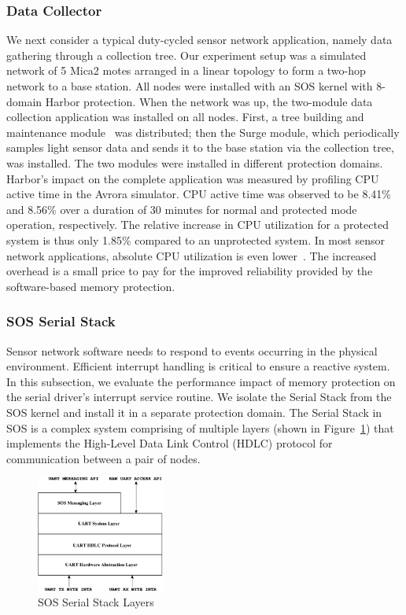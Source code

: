 \subsubsection{Data Collector}
%
We next consider a typical duty-cycled sensor network application,
namely data gathering through a collection tree.
%
Our experiment setup was a simulated network of 5 Mica2 motes arranged
in a linear topology to form a two-hop network to a base station.
%
All nodes were installed with an SOS kernel with 8-domain Harbor protection.
%
When the network was up, the two-module data collection application was
installed on all nodes.
%
First, a tree building and maintenance module~\cite{woo03surge} was
distributed; then
%
the Surge module, which periodically samples light sensor data and sends it
to the base station via the collection tree, was installed.
%
The two modules were installed in different protection domains.
%
Harbor's impact on the complete application was measured by profiling CPU
active time in the Avrora simulator.
%
CPU active time was observed to be 8.41\% and 8.56\% over a duration
of 30 minutes for normal and protected mode operation, respectively. 
%
The relative increase in CPU utilization for a protected system is
thus only 1.85\% compared to an unprotected system.
%
In most sensor network applications, absolute CPU utilization is even
lower~\cite{tkernel06sensys}.
%
The increased overhead is a small price to pay for the improved
reliability provided by the software-based memory protection.
\subsubsection{SOS Serial Stack}
%
Sensor network software needs to respond to events occurring in the
physical environment.
%
Efficient interrupt handling is critical to ensure a reactive system.
%
In this subsection, we evaluate the performance impact of memory
protection on the serial driver's interrupt service routine.
%
We isolate the Serial Stack from the SOS kernel and install it in a
separate protection domain.
%
The Serial Stack in SOS is a complex system comprising of multiple
layers (shown in Figure~\ref{fig:serialstack}) that implements the
High-Level Data Link Control (HDLC) protocol for communication between
a pair of nodes.
%
\begin{figure}[htbp]
  \centering
   \includegraphics[height = 1.5in,
   keepaspectratio=true]{figures/serialstack.eps} 
   \caption{SOS Serial Stack Layers}
   \label{fig:serialstack}
\end{figure}
%

